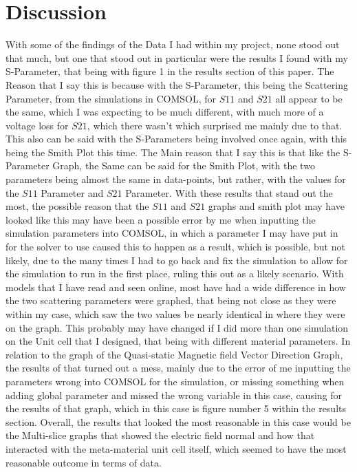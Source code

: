 \documentclass[]{article}
\begin{document}
\section*{Discussion}
With some of the findings of the Data I had within my project, none stood out that much, but one that stood out in particular were the results I found with my S-Parameter, that being with figure 1 in the results section of this paper. The Reason that I say this is because with the S-Parameter, this being the Scattering Parameter, from the simulations in COMSOL, for $S11$ and $S21$ all appear to be the same, which I was expecting to be much different, with much more of a voltage loss for $S21$, which there wasn't which surprised me mainly due to that. This also can be said with the S-Parameters being involved once again, with this being the Smith Plot this time. The Main reason that I say this is that like the S-Parameter Graph, the Same can be said for the Smith Plot, with the two parameters being almost the same in data-points, but rather, with the values for the $S11$ Parameter and $S21$ Parameter. With these results that stand out the most, the possible reason that the $S11$ and $S21$ graphs and smith plot may have looked like this may have been a possible error by me when inputting the simulation parameters into COMSOL, in which a parameter I may have put in for the solver to use caused this to happen as a result, which is possible, but not likely, due to the many times I had to go back and fix the simulation to allow for the simulation to run in the first place, ruling this out as a likely scenario. With models that I have read and seen online, most have had a wide difference in how the two scattering parameters were graphed, that being not close as they were within my case, which saw the two values be nearly identical in where they were on the graph. This probably may have changed if I did more than one simulation on the Unit cell that I designed, that being with different material parameters. In relation to the graph of the Quasi-static Magnetic field Vector Direction Graph, the results of that turned out a mess, mainly due to the error of me inputting the parameters wrong into COMSOL for the simulation, or missing something when adding global parameter and missed the wrong variable in this case, causing for the results of that graph, which in this case is figure number 5 within the results section. Overall, the results that looked the most reasonable in this case would be the Multi-slice graphs that showed the electric field normal and how that interacted with the meta-material unit cell itself, which seemed to have the most reasonable outcome in terms of data.
\end{document}
